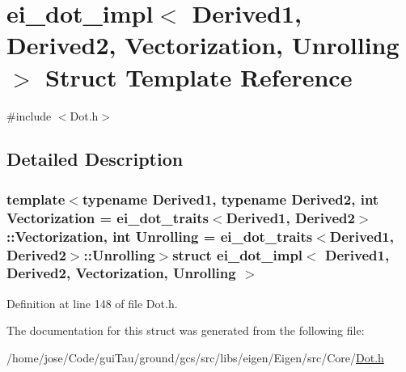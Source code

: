 \hypertarget{structei__dot__impl}{\section{ei\-\_\-dot\-\_\-impl$<$ Derived1, Derived2, Vectorization, Unrolling $>$ Struct Template Reference}
\label{structei__dot__impl}
}


{\ttfamily \#include $<$Dot.\-h$>$}



\subsection{Detailed Description}
\subsubsection*{template$<$typename Derived1, typename Derived2, int Vectorization = ei\-\_\-dot\-\_\-traits$<$\-Derived1, Derived2$>$\-::\-Vectorization, int Unrolling = ei\-\_\-dot\-\_\-traits$<$\-Derived1, Derived2$>$\-::\-Unrolling$>$struct ei\-\_\-dot\-\_\-impl$<$ Derived1, Derived2, Vectorization, Unrolling $>$}



Definition at line 148 of file Dot.\-h.



The documentation for this struct was generated from the following file\-:\begin{DoxyCompactItemize}
\item 
/home/jose/\-Code/gui\-Tau/ground/gcs/src/libs/eigen/\-Eigen/src/\-Core/\hyperlink{_dot_8h}{Dot.\-h}\end{DoxyCompactItemize}
